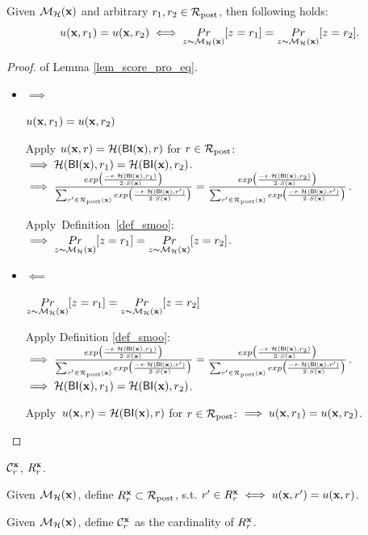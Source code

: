 \documentclass{article}
\begin{document}
\begin{lem}
\label{lem_score_pro_eq}
  Given $\hexpmech(\dataobs)$ and arbitrary $r_1, r_2 \in \candidateset$, then following holds:
  $$
  \ux{r_1} = \ux{r_2} \iff \hexpmechPr{\dataobs}{z = r_1} = \hexpmechPr{\dataobs}{z = r_2}.
  $$  
\end{lem}
\begin{proof} of Lemma \ref{lem_score_pro_eq}.
\begin{itemize}
  \item $\implies$

  $\ux{r_1} = \ux{r_2}$

  Apply $\ux{r} = \hellinger(\bysinfer(\dataobs), r)$ for $r \in \candidateset$:\\
  $\implies \hellinger(\bysinfer(\dataobs), r_1) = \hellinger(\bysinfer(\dataobs), r_2)$. \\
  $\implies \frac {exp\big(\frac{-\epsilon\cdot\hellinger(\bysinfer(\dataobs),r_1)}{2\cdot S(\dataobs)}\big)}{\nomalizer{\dataobs}} 
  = \frac {exp\big(\frac{-\epsilon\cdot\hellinger(\bysinfer(\dataobs),r_2)}{2\cdot S(\dataobs)}\big)}{\nomalizer{\dataobs}}$.

  Apply\ Definition\ \ref{def_smoo}:\\
  $\implies \hexpmechPr{\dataobs}{z = r_1} = \hexpmechPr{\dataobs}{z = r_2}$.


  \item $\impliedby$

  $\hexpmechPr{\dataobs}{z = r_1} = \hexpmechPr{\dataobs}{z = r_2} $

  Apply Definition \ref{def_smoo}:\\
  $\implies \frac {exp\big(\frac{-\epsilon\cdot\hellinger(\bysinfer(\dataobs),r_1)}{2\cdot S(\dataobs)}\big)}{\nomalizer{\dataobs}} 
    = \frac {exp\big(\frac{-\epsilon\cdot\hellinger(\bysinfer(\dataobs),r_2)}{2\cdot S(\dataobs)}\big)}{\nomalizer{\dataobs}}$.\\
  $\implies  \hellinger(\bysinfer(\dataobs), r_1) = \hellinger(\bysinfer(\dataobs), r_2)$.

  Apply\ $\ux{r} = \hellinger(\bysinfer(\dataobs), r)$ for $r \in \candidateset$:
  $\implies \ux{r_1} = \ux{r_2}$.

\end{itemize}

\end{proof}

\begin{definition}
\label{def_cardinality}
  $\cardinality{\dataobs}{r}$, $R^{\dataobs}_r$.

  Given $\hexpmech(\dataobs)$, define $R^{\dataobs}_r \subset \candidateset$, s.t. $r' \in R^{\dataobs}_r \iff \ux{r'} = \ux{r}$.

  Given $\hexpmech(\dataobs)$, define $\cardinality{\dataobs}{r}$ as the cardinality of $R^{\dataobs}_r$. 
\end{definition}
\end{document}
